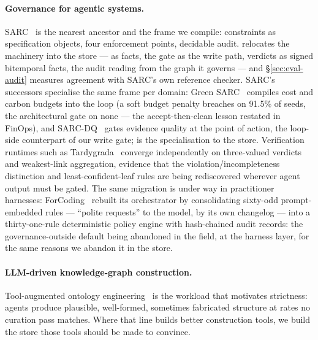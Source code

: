 \paragraph{Governance for agentic systems.}
SARC~\cite{besanson2026sarc} is the nearest ancestor and the frame we
compile: constraints as specification objects, four enforcement
points, decidable audit. \sys relocates the machinery into the store ---
\Sig as facts, the gate as the write path, verdicts as signed
bitemporal facts, the audit reading \Sig from the graph it governs ---
and \S\ref{sec:eval-audit} measures agreement with SARC's own
reference checker. SARC's successors specialise the same frame per
domain: Green SARC~\cite{besanson2026greensarc} compiles cost and
carbon budgets into the loop (a soft budget penalty breaches on
91.5\% of seeds, the architectural gate on none --- the
accept-then-clean lesson restated in FinOps), and
SARC-DQ~\cite{besanson2026sarcdq} gates evidence quality at the point
of action, the loop-side counterpart of our write gate; \sys is the
specialisation to the store. Verification runtimes such as
Tardygrada~\cite{rovai2026tardygrada} converge independently on
three-valued verdicts and weakest-link aggregation, evidence that the
violation/incompleteness distinction and least-confident-leaf rules
are being rediscovered wherever agent output must be gated. The same
migration is under way in practitioner harnesses:
ForCoding~\cite{forcoding2026} rebuilt its orchestrator by
consolidating sixty-odd prompt-embedded rules --- ``polite requests''
to the model, by its own changelog --- into a thirty-one-rule
deterministic policy engine with hash-chained audit records: the governance-outside default being
abandoned in the field, at the harness layer, for the same reasons we
abandon it in the store.

\paragraph{LLM-driven knowledge-graph construction.}
Tool-augmented ontology engineering~\cite{rovai2026openontologies,
zhang2024accelerating} is the workload that motivates strictness:
agents produce plausible, well-formed, sometimes fabricated structure
at rates no curation pass matches. Where that line builds better
construction tools, we build the store those tools should be made to
convince.

